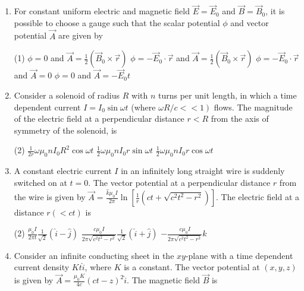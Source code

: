 \begin{enumerate}
	\item  For constant uniform electric and magnetic field $\vec{E}=\vec{E}_{0}$ and $\vec{B}=\vec{B}_{0}$, it is possible to choose a gauge such that the scalar potential $\phi$ and vector potential $\vec{A}$ are given by
		{}
		\begin{tasks}(1)
			\task[\textbf{A.}] $\phi=0$ and $\vec{A}=\frac{1}{2}\left(\vec{B}_{0} \times \vec{r}\right)$
			\task[\textbf{B.}] $\phi=-\vec{E}_{0} \cdot \vec{r}$ and $\vec{A}=\frac{1}{2}\left(\vec{B}_{0} \times \vec{r}\right)$
			\task[\textbf{C.}]  $\phi=-\vec{E}_{0} \cdot \vec{r}$ and $\vec{A}=0$
			\task[\textbf{D.}] $\phi=0$ and $\vec{A}=-\vec{E}_{0} t$
		\end{tasks}
	\item	Consider a solenoid of radius $R$ with $n$ turns per unit length, in which a time dependent current $I=I_{0} \sin \omega t$ (where $\left.\omega R / c<<1\right)$ flows. The magnitude of the electric field at a perpendicular distance $r<R$ from the axis of symmetry of the solenoid, is
		{\exyear{NET/JRF(DEC-2011)}}
		\begin{tasks}(2)
			\task[\textbf{A.}]  0
			\task[\textbf{B.}] $\frac{1}{2 r} \omega \mu_{0} n I_{0} R^{2} \cos \omega t$
			\task[\textbf{C.}] $\frac{1}{2} \omega \mu_{0} n I_{0} r \sin \omega t$
			\task[\textbf{D.}]  $\frac{1}{2} \omega \mu_{0} n I_{0} r \cos \omega t$
		\end{tasks}
\item	A constant electric current $I$ in an infinitely long straight wire is suddenly switched on at $t=0$. The vector potential at a perpendicular distance $r$ from the wire is given by $\vec{A}=\frac{\hat{k} \mu_{0} I}{2 \pi} \ln \left[\frac{1}{r}\left(c t+\sqrt{c^{2} t^{2}-r^{2}}\right)\right]$. The electric field at a distance $r(<c t)$ is
		{}
		\begin{tasks}(2)
			\task[\textbf{B.}] $\frac{\mu_{0} I}{2 \pi t} \frac{1}{\sqrt{2}}(\hat{i}-\hat{j})$
			\task[\textbf{C.}] $\frac{c \mu_{0} I}{2 \pi \sqrt{c^{2} t^{2}-r^{2}}} \frac{1}{\sqrt{2}}(\hat{i}+\hat{j})$
			\task[\textbf{D.}] $-\frac{c \mu_{0} I}{2 \pi \sqrt{c^{2} t^{2}-r^{2}}} \hat{k}$
		\end{tasks}
\item Consider an infinite conducting sheet in the $x y$-plane with a time dependent current density $K t \hat{i}$, where $K$ is a constant. The vector potential at $(x, y, z)$ is given by $\vec{A}=\frac{\mu_{0} K}{4 c}(c t-z)^{2} \hat{i}$. The magnetic field $\vec{B}$ is

\end{enumerate}

